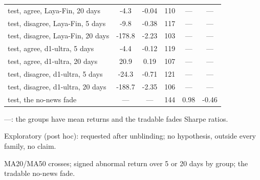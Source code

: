 \begin{table}[htbp]
\begin{threeparttable}
\begin{tabular}{@{}lS[table-format=-3.1]S[table-format=-1.2]S[table-format=3.0]S[table-format=1.2]S[table-format=-1.2]@{}}
test, agree, Laya-Fin, 20 days & -4.3 & -0.04 & 110 & {---} & {---} \\
test, disagree, Laya-Fin, 5 days & -9.8 & -0.38 & 117 & {---} & {---} \\
test, disagree, Laya-Fin, 20 days & -178.8 & -2.23 & 103 & {---} & {---} \\
test, agree, d1-ultra, 5 days & -4.4 & -0.12 & 119 & {---} & {---} \\
test, agree, d1-ultra, 20 days & 20.9 & 0.19 & 107 & {---} & {---} \\
test, disagree, d1-ultra, 5 days & -24.3 & -0.71 & 121 & {---} & {---} \\
test, disagree, d1-ultra, 20 days & -188.7 & -2.35 & 106 & {---} & {---} \\
test, the no-news fade & {---} & {---} & 144 & 0.98 & -0.46 \\
\bottomrule
\end{tabular}
\begin{tablenotes}[flushleft]\footnotesize
\item ---: the groups have mean returns and the tradable fades Sharpe ratios.
\item Exploratory (post hoc): requested after unblinding; no hypothesis, outside every family, no claim.
\item MA20/MA50 crosses; signed abnormal return over 5 or 20 days by group; the tradable no-news fade.
\end{tablenotes}
\end{threeparttable}
\end{table}
